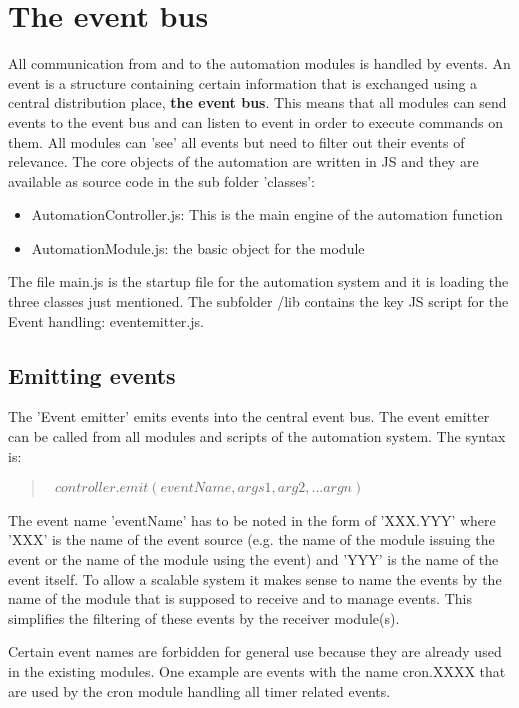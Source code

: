 \section{The event bus}
\label{cap:eventbus}

All communication from and to the automation modules is handled by events. An event 
is a structure containing certain information that is exchanged using a central 
distribution place, {\bf the event bus}. This means that all modules can send events 
to the event bus and can listen to event in order to execute commands on them. All 
modules can 'see' all events but need to filter out their events of relevance.  The 
core objects of the automation are written in JS and they are available as source 
code in the sub folder 'classes':

\begin{itemize}
\item AutomationController.js: This is the main engine of the automation function
\item AutomationModule.js: the basic object for the module
\end{itemize}

The file main.js is the startup file for the automation system and it is loading the three 
classes just mentioned. The subfolder /lib contains the key JS script for the Event 
handling: eventemitter.js.

\subsection{Emitting events}

The 'Event emitter' emits events into the central event bus. The event emitter can 
be called from all modules and scripts of the automation system. The syntax is:

\begin{quote}
\texttt{  
$controller.emit(eventName, args1,arg2,...argn)$
}
\end{quote}

The event name 'eventName' has to be noted in the form of 'XXX.YYY' where 'XXX' is the name 
of the event source (e.g. the name of the module issuing the event or the name of the 
module using the event) and 'YYY' is the name of the event itself.  To allow a scalable 
system it makes sense to name the events by the name of the module that is supposed to 
receive and to manage events. This simplifies the filtering of these events by the 
receiver module(s).

Certain event names are forbidden for general use because they are already used in the 
existing modules. One example are events with the name cron.XXXX that are used by the 
cron module handling all timer related events.

